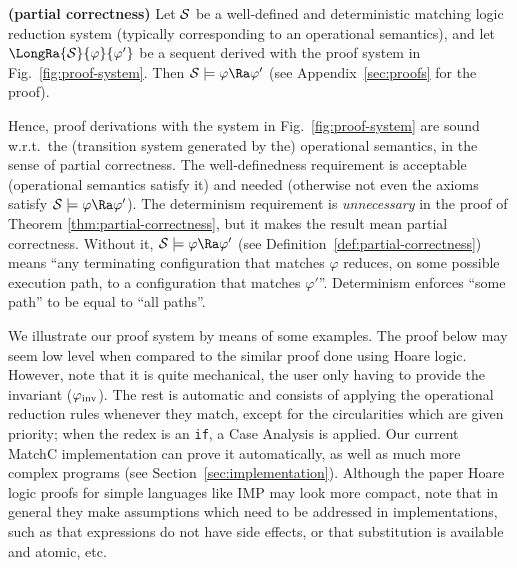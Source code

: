 \documentclass{llncs}
\begin{document}
\begin{theorem}
%
\label{thm:partial-correctness}
%
\textbf{(partial correctness)} Let $\cal S$ be a well-defined and deterministic
matching logic reduction system (typically corresponding to an operational
semantics), and let $\LongRa{\cal S}{\varphi}{\varphi'}$ be a sequent derived
with the proof system in Fig.~\ref{fig:proof-system}.  Then ${\cal S} \models
\varphi \Ra \varphi'$ (see Appendix~\ref{sec:proofs} for the proof).
%
\end{theorem}

Hence, proof derivations with the system in Fig.~\ref{fig:proof-system} are
sound w.r.t.\ the (transition system generated by the) operational semantics, in
the sense of partial correctness.  The well-definedness requirement is
acceptable (operational semantics satisfy it) and needed (otherwise not even the
axioms satisfy ${\cal S} \models \varphi \Ra \varphi'$).  The determinism
requirement is {\em unnecessary} in the proof of Theorem
\ref{thm:partial-correctness}, but it makes the result mean partial correctness.
Without it, ${\cal S} \models \varphi \Ra \varphi'$ (see
Definition~\ref{def:partial-correctness}) means ``any terminating configuration
that matches $\varphi$ reduces, on some possible execution path, to a
configuration that matches $\varphi'$''.  Determinism enforces ``some path'' to
be equal to ``all paths''.

We illustrate our proof system by means of some examples.  The proof below may
seem low level when compared to the similar proof done using Hoare logic.
However, note that it is quite mechanical, the user only having to provide the
invariant ($\varphi_{\rm inv}$).  The rest is automatic and consists of applying
the operational reduction rules whenever they match, except for the
circularities which are given priority; when the redex is an {\tt if}, a Case
Analysis is applied.  Our current MatchC implementation can prove it
automatically, as well as much more complex programs (see
Section~\ref{sec:implementation}).  Although the paper Hoare logic proofs for
simple languages like IMP may look more compact, note that in general they make
assumptions which need to be addressed in implementations, such as that
expressions do not have side effects, or that substitution is available and
atomic, etc.
\end{document}
